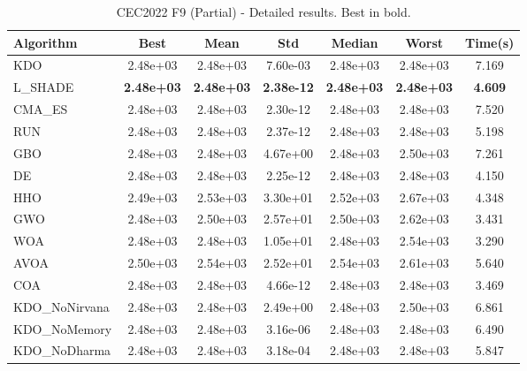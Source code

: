 \begin{table}[H]
\centering\small
\caption{CEC2022 F9 (Partial) - Detailed results. Best in bold.}
\label{tab:cec2022_F9}
\begin{tabular}{lcccccc}
\toprule
\textbf{Algorithm} & \textbf{Best} & \textbf{Mean} & \textbf{Std} & \textbf{Median} & \textbf{Worst} & \textbf{Time(s)} \\
\midrule
KDO & 2.48e+03 & 2.48e+03 & 7.60e-03 & 2.48e+03 & 2.48e+03 & 7.169 \\
L_SHADE & \textbf{2.48e+03} & \textbf{2.48e+03} & \textbf{2.38e-12} & \textbf{2.48e+03} & \textbf{2.48e+03} & \textbf{4.609} \\
CMA_ES & 2.48e+03 & 2.48e+03 & 2.30e-12 & 2.48e+03 & 2.48e+03 & 7.520 \\
RUN & 2.48e+03 & 2.48e+03 & 2.37e-12 & 2.48e+03 & 2.48e+03 & 5.198 \\
GBO & 2.48e+03 & 2.48e+03 & 4.67e+00 & 2.48e+03 & 2.50e+03 & 7.261 \\
DE & 2.48e+03 & 2.48e+03 & 2.25e-12 & 2.48e+03 & 2.48e+03 & 4.150 \\
HHO & 2.49e+03 & 2.53e+03 & 3.30e+01 & 2.52e+03 & 2.67e+03 & 4.348 \\
GWO & 2.48e+03 & 2.50e+03 & 2.57e+01 & 2.50e+03 & 2.62e+03 & 3.431 \\
WOA & 2.48e+03 & 2.48e+03 & 1.05e+01 & 2.48e+03 & 2.54e+03 & 3.290 \\
AVOA & 2.50e+03 & 2.54e+03 & 2.52e+01 & 2.54e+03 & 2.61e+03 & 5.640 \\
COA & 2.48e+03 & 2.48e+03 & 4.66e-12 & 2.48e+03 & 2.48e+03 & 3.469 \\
KDO_NoNirvana & 2.48e+03 & 2.48e+03 & 2.49e+00 & 2.48e+03 & 2.50e+03 & 6.861 \\
KDO_NoMemory & 2.48e+03 & 2.48e+03 & 3.16e-06 & 2.48e+03 & 2.48e+03 & 6.490 \\
KDO_NoDharma & 2.48e+03 & 2.48e+03 & 3.18e-04 & 2.48e+03 & 2.48e+03 & 5.847 \\
\bottomrule
\end{tabular}
\end{table}
